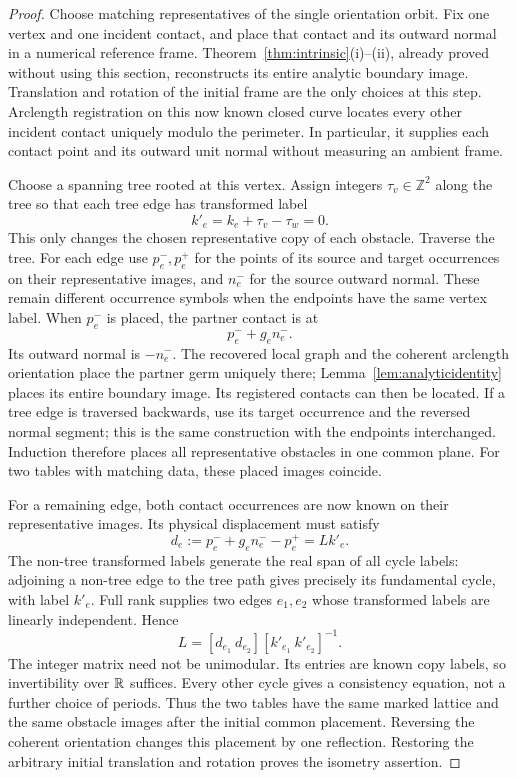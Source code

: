 \begin{proof}
Choose matching representatives of the single orientation orbit. Fix
one vertex and one incident contact, and place that contact and its
outward normal in a numerical reference frame. Theorem~\ref{thm:intrinsic}(i)--(ii),
already proved without using this section, reconstructs its entire
analytic boundary image. Translation and rotation of the initial frame
are the only choices at this step. Arclength registration on this now
known closed curve locates every other incident contact uniquely modulo
the perimeter. In particular, it supplies each contact point and its
outward unit normal without measuring an ambient frame.

Choose a spanning tree rooted at this vertex. Assign integers
$\tau_v\in\mathbb Z^2$ along the tree so that each tree edge has
transformed label
\[
 k'_e=k_e+\tau_v-\tau_w=0.
\]
This only changes the chosen representative copy of each obstacle.
Traverse the tree. For each edge use $p_e^-,p_e^+$ for the points of its source and
target occurrences on their representative images, and $n_e^-$ for
the source outward normal. These remain different occurrence symbols
when the endpoints have the same vertex label. When $p_e^-$ is placed,
the partner contact is at
\begin{equation}\label{eq:placepartner}
 p_e^-+g_e n_e^-.
\end{equation}
Its outward normal is $-n_e^-$. The recovered local graph and the
coherent arclength orientation place the partner germ uniquely there;
Lemma~\ref{lem:analyticidentity} places its entire boundary image.
Its registered contacts can then be located. If a tree edge is traversed
backwards, use its target occurrence and the reversed normal segment;
this is the same construction with the endpoints interchanged. Induction
therefore places all representative obstacles in one common plane.
For two tables with matching data, these placed images coincide.

For a remaining edge, both contact occurrences are now known on their
representative images. Its physical displacement must satisfy
\begin{equation}\label{eq:cyclelinear}
 d_e:=p_e^-+g_e n_e^--p_e^+=L k'_e.
\end{equation}
The non-tree transformed labels generate the real span of all cycle
labels: adjoining a non-tree edge to the tree path gives precisely its
fundamental cycle, with label $k'_e$. Full rank supplies two edges
$e_1,e_2$ whose transformed labels are linearly independent. Hence
\begin{equation}\label{eq:latticerecover}
 L=[d_{e_1}\ d_{e_2}]
                 [k'_{e_1}\ k'_{e_2}]^{-1}.
\end{equation}
The integer matrix need not be unimodular. Its entries are known copy
labels, so invertibility over $\mathbb R$ suffices. Every other cycle gives
a consistency equation, not a further choice of periods. Thus the two
tables have the same marked lattice and the same obstacle images after
the initial common placement. Reversing the coherent orientation changes
this placement by one reflection. Restoring the arbitrary initial
translation and rotation proves the isometry assertion.
\end{proof}

